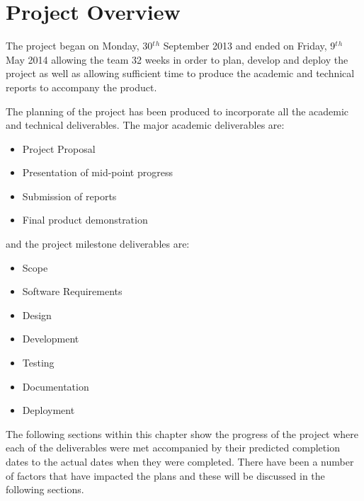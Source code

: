 \section{Project Overview}
\label{sec:project_overview}

The project began on Monday, 30$^t$$^h$ September 2013 and ended on Friday,
9$^t$$^h$ May 2014 allowing the team 32 weeks in order to plan, develop and
deploy the project as well as allowing sufficient time to produce the academic
and technical reports to accompany the product.

The planning of the project has been produced to incorporate all the academic
and technical deliverables. The major academic deliverables are:

\begin{itemize}
  \item Project Proposal
  \item Presentation of mid-point progress
  \item Submission of reports
  \item Final product demonstration
\end{itemize}

and the project milestone deliverables are:

\begin{itemize}
  \item Scope
  \item Software Requirements
  \item Design
  \item Development
  \item Testing
  \item Documentation
  \item Deployment
\end{itemize}

The following sections within this chapter show the progress of the project
where each of the deliverables were met accompanied by their predicted
completion dates to the actual dates when they were completed. There have been a
number of factors that have impacted the plans and these will be discussed in
the following sections.
